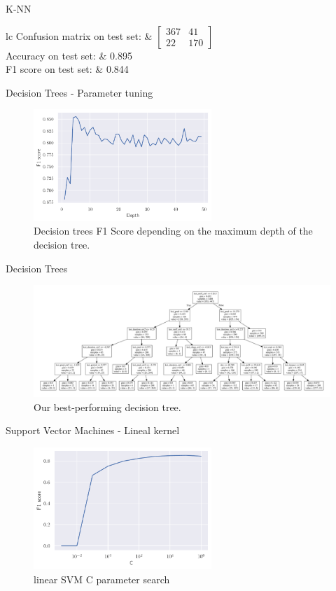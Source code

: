 \documentclass[aspectratio=169]{beamer}
\newcommand{\fresults}[3]{
\begin{table}[H]
\centering
\begin{tabular}{lc}
Confusion matrix on test set: & \( \begin{bmatrix} #1 \end{bmatrix} \) \\
    \addlinespace[0.5em]
    Accuracy on test set: & #2 \\
    F1 score on test set: & #3
\end{tabular}
\end{table}
}
\begin{document}
\begin{frame}{K-NN}

\fresults{ 367 &  41 \\ 22 & 170 }{0.895}{0.844}

\end{frame}

\begin{frame}{Decision Trees - Parameter tuning}
\begin{figure}[H]
    \centering
    \includegraphics[width=0.6\textwidth]{decision_trees}
    \caption{Decision trees F1 Score depending on the maximum depth of the decision tree.}%
    \label{fig:decision_trees_acc}
\end{figure}
\end{frame}

\begin{frame}{Decision Trees}
\begin{figure}[H]
    \centering
    \includegraphics[width=\textwidth]{decision_tree}
    \caption{Our best-performing decision tree.}%
    \label{fig:decision_trees}
\end{figure}
\end{frame}

\begin{frame}{Support Vector Machines - Lineal kernel}

\begin{figure}[H]
    \centering
    \includegraphics[width=0.6\textwidth]{svm_linear_C_cv}
    \caption{linear SVM C parameter search}%
    \label{fig:svm_linear_C_cv}
\end{figure}

\end{frame}
\end{document}
